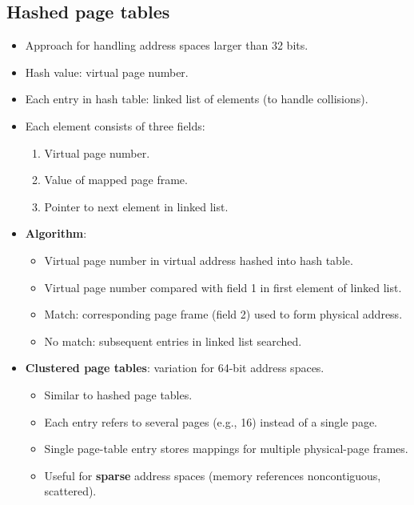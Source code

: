 \subsection{Hashed page tables}
\begin{itemize}
    \item Approach for handling address spaces larger than 32 bits.
    \item Hash value: virtual page number.
    \item Each entry in hash table: linked list of elements (to handle collisions).
    \item Each element consists of three fields:
    \begin{enumerate}
        \item Virtual page number.
        \item Value of mapped page frame.
        \item Pointer to next element in linked list.
    \end{enumerate}
    \item \textbf{Algorithm}:
    \begin{itemize}
        \item Virtual page number in virtual address hashed into hash table.
        \item Virtual page number compared with field 1 in first element of linked list.
        \item Match: corresponding page frame (field 2) used to form physical address.
        \item No match: subsequent entries in linked list searched.
    \end{itemize}
    \item \textbf{Clustered page tables}: variation for 64-bit address spaces.
    \begin{itemize}
        \item Similar to hashed page tables.
        \item Each entry refers to several pages (e.g., 16) instead of a single page.
        \item Single page-table entry stores mappings for multiple physical-page frames.
        \item Useful for \textbf{sparse} address spaces (memory references noncontiguous, scattered).
    \end{itemize}
\end{itemize}

